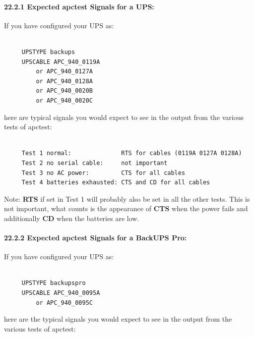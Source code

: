 {{{{{{{{{{\label{Expected-apctest-Signals-for-a-UPS}

\paragraph*{22.2.1 Expected apctest Signals for a UPS:}

\label{index-Testing-224}
\label{index-apctest-225}
If you have configured your UPS as: 

\footnotesize
\begin{verbatim}
     
     UPSTYPE backups
     UPSCABLE APC_940_0119A
         or APC_940_0127A
         or APC_940_0128A
         or APC_940_0020B
         or APC_940_0020C
\end{verbatim}
\normalsize

here are typical signals you would expect to see in the output from the
various tests of apctest: 

\footnotesize
\begin{verbatim}
     
     Test 1 normal:              RTS for cables (0119A 0127A 0128A)
     Test 2 no serial cable:     not important
     Test 3 no AC power:         CTS for all cables
     Test 4 batteries exhausted: CTS and CD for all cables
\end{verbatim}
\normalsize

Note: {\bf RTS} if set in Test 1 will probably also be set in all the other
tests. This is not important, what counts is the appearance of {\bf CTS} when
the power fails and additionally {\bf CD} when the batteries are low. 

\label{Expected-apctest-Signals-for-a-BackUPS-Pro}

\paragraph*{22.2.2 Expected apctest Signals for a BackUPS Pro:}

\label{index-Testing-226}
\label{index-apctest-227}
If you have configured your UPS as: 

\footnotesize
\begin{verbatim}
     
     UPSTYPE backupspro
     UPSCABLE APC_940_0095A
         or APC_940_0095C
\end{verbatim}
\normalsize

here are the typical signals you would expect to see in the output from the
various tests of apctest: 

}}}}}}}}}}
